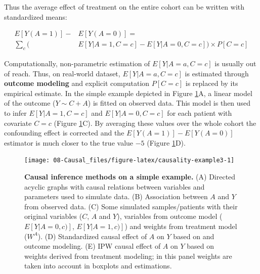 \documentclass[a4paper,12pt,twoside,onecolumn,openright,final,oldfontcommands]{memoir}
\begin{document}
Thus the average effect of treatment on the entire cohort can be written
with standardized means:

\begin{equation}
\begin{aligned}
  E[Y(A=1)] - & E[Y(A=0)] = \\ 
   \sum_{c} \Big( & E[Y | A=1, C=c]-E[Y | A=0, C=c]\Big) \times P[C=c]
\end{aligned}
\end{equation}

Computationally, non-parametric estimation of \(E[Y | A=a, C=c]\) is
usually out of reach. Thus, on real-world dataset, \(E[Y | A=a, C=c]\)
is estimated through \textbf{outcome modeling} and explicit computation
\(P[C=c]\) is replaced by its empirical estimate. In the simple example
depicted in Figure \ref{fig:causality-example3}A, a linear model of the
outcome (\(Y\sim C+A\)) is fitted on observed data. This model is then
used to infer \(E[Y | A=1, C=c]\) and \(E[Y | A=0, C=c]\) for each
patient with covariate \(C=c\) (Figure \ref{fig:causality-example3}C).
By averaging these values over the whole cohort the confounding effect
is corrected and the \(E[Y(A=1)]-E[Y(A=0)]\) estimator is much closer to
the true value \(-5\) (Figure \ref{fig:causality-example3}D).

\begin{figure}

{\centering \texttt{[image: 08-Causal\_files/figure-latex/causality-example3-1]} 

}

\caption[Causal inference methods on a simple example]{\textbf{Causal inference methods on a
simple example.} (A) Directed acyclic graphs with causal relations
between variables and parameters used to simulate data. (B) Association
between \(A\) and \(Y\) from observed data. (C) Some simulated
samples/patients with their original variables (\(C\), \(A\) and \(Y\)),
variables from outcome model (\(E[Y|A=0,c)]\), \(E[Y|A=1,c)]\)) and
weights from treatment model (\(W^A\)). (D) Standardized causal effect
of \(A\) on \(Y\) based on and outcome modeling. (E) IPW causal effect
of \(A\) on \(Y\) based on weights derived from treatment modeling; in
this panel weights are taken into account in boxplots and estimations.}\label{fig:causality-example3}
\end{figure}
\end{document}
